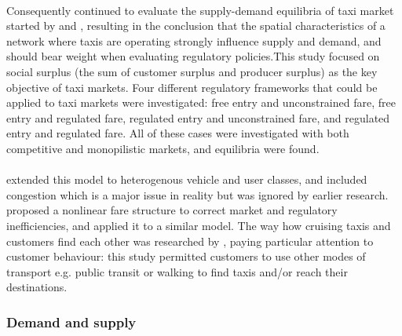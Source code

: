 \paragraph{}Consequently \textcite{Yang2002taxi+demand} continued to evaluate
the supply-demand equilibria of taxi market started by
\textcite{Yang1998taxi+network} and \textcite{Yang2000taxi+utilization},
resulting in the conclusion that the spatial characteristics of a network where
taxis are operating strongly influence supply and demand, and should bear
weight when evaluating regulatory policies.This study focused on social surplus
(the sum of customer surplus and producer surplus) as the key objective of taxi
markets. Four different regulatory frameworks that could be applied to taxi
markets were investigated: free entry and unconstrained fare, free entry and
regulated fare, regulated entry and unconstrained fare, and regulated entry and
regulated fare. All of these cases were investigated with both competitive and
monopilistic markets, and equilibria were found.

\paragraph{}\textcite{Wong2008taxi+modeling} extended this model to
heterogenous vehicle and user classes, and included congestion which is a major
issue in reality but was ignored by earlier research.
\textcite{Yang2010taxi+nonlinear} proposed a nonlinear fare structure to
correct market and regulatory inefficiencies, and applied it to a similar
model. The way how cruising taxis and customers find each other was researched
by \textcite{Yang2010taxi+equilibria}, paying particular attention to customer
behaviour: this study permitted customers to use other modes of transport e.g.
public transit or walking to find taxis and/or reach their destinations.

\subsubsection{Demand and supply}
\label{sec:literature:taxis:demand}

